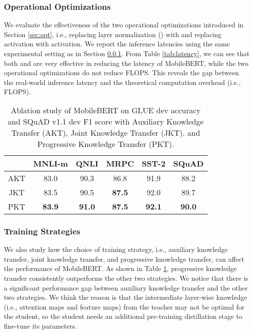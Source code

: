\documentclass[11pt,a4paper]{article}
\begin{document}
\subsubsection{Operational Optimizations}\label{app:latency}

 We evaluate the effectiveness of the two operational optimizations introduced in Section \ref{sec:opt}, i.e., replacing layer normalization () with  and replacing  activation with  activation. We report the inference latencies using the same experimental setting as in Section \ref{app:latency}. From Table \ref{tab:latency}, we can see that both  and  are very effective in reducing the latency of MobileBERT, while the two operational optimizations do not reduce FLOPS. This reveals the gap between the real-world inference latency and the theoretical computation overhead (i.e., FLOPS).








\setlength{\tabcolsep}{3pt}
\begin{table}[t]





\begin{center}
	    \small
		\begin{tabular}{c | c c c c c}
			\hline
             & \textbf{MNLI-m} & \textbf{QNLI} & \textbf{MRPC} & \textbf{SST-2} & \textbf{SQuAD}\\
             \hline
			 AKT & 83.0 & 90.3 & 86.8 & 91.9 & 88.2\\
			 JKT & 83.5 & 90.5 & \textbf{87.5} & 92.0 & 89.7\\
			 PKT & \textbf{83.9} & \textbf{91.0} &\textbf{87.5} & \textbf{92.1} & \textbf{90.0}\\
			\hline
		\end{tabular}
	\end{center}
\caption{Ablation study of MobileBERT on GLUE dev accuracy and SQuAD v1.1 dev F1 score with Auxiliary Knowledge Transfer (AKT), Joint Knowledge Transfer (JKT), and Progressive Knowledge Transfer (PKT).}
\label{tab:strategy}
\end{table}

\setlength{\tabcolsep}{6pt}


\subsubsection{Training Strategies}

We also study how the choice of training strategy, i.e., auxiliary knowledge transfer, joint knowledge transfer, and progressive knowledge transfer, can affect the performance of MobileBERT. As shown in Table \ref{tab:strategy}, progressive knowledge transfer consistently outperforms the other two strategies. We notice that there is a significant performance gap between auxiliary knowledge transfer and the other two strategies. We think the reason is that the intermediate layer-wise knowledge (i.e., attention maps and feature maps) from the teacher may not be optimal for the student, so the student needs an additional pre-training distillation stage to fine-tune its parameters.
\end{document}
